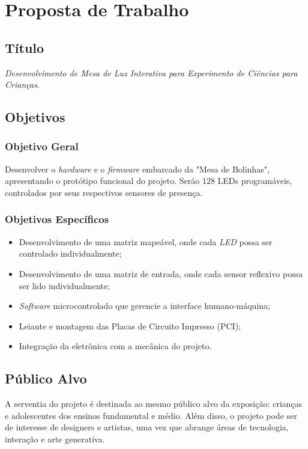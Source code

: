 \documentclass[a4paper,12pt]{article}
\begin{document}
	
  \clearpage
  
  \section{Proposta de Trabalho}
  
  \subsection{Título}
  
  \emph{Desenvolvimento de Mesa de Luz Interativa para Experimento de Ciências para Crianças}.
  
  \subsection{Objetivos}
  \subsubsection{Objetivo Geral}
  
  Desenvolver o \emph{hardware} e o \emph{firmware} embarcado da "Mesa de Bolinhas", apresentando o protótipo funcional do projeto. Serão 128 LEDs programáveis, controlados por seus respectivos sensores de presença.
  
  \subsubsection{Objetivos Específicos}
  \begin{itemize}
      \item Desenvolvimento de uma matriz mapeável, onde cada \emph{LED} possa ser controlado individualmente;
      \item Desenvolvimento de uma matriz de entrada, onde cada sensor reflexivo possa ser lido individualmente;
      \item \emph{Software} microcontrolado que gerencie a interface humano-máquina;
      \item Leiaute e montagem das Placas de Circuito Impresso (PCI);
      \item Integração da eletrônica com a mecânica do projeto.
  \end{itemize}
  
  \subsection{Público Alvo}
  A serventia do projeto é destinada ao mesmo público alvo da exposição: crianças e adolescentes dos ensinos fundamental e médio. Além disso, o projeto pode ser de interesse de designers e artistas, uma vez que abrange áreas de tecnologia, interação e arte generativa.
  
\end{document}
